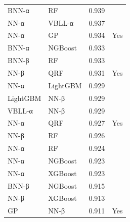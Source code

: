 \begin{tabular}{llrl}
BNN-α & RF & 0.939 &  \\
NN-α & VBLL-α & 0.937 &  \\
NN-α & GP & 0.934 & Yes \\
BNN-α & NGBoost & 0.933 &  \\
BNN-β & RF & 0.933 &  \\
NN-β & QRF & 0.931 & Yes \\
NN-α & LightGBM & 0.929 &  \\
LightGBM & NN-β & 0.929 &  \\
VBLL-α & NN-β & 0.929 &  \\
NN-α & QRF & 0.927 & Yes \\
NN-β & RF & 0.926 &  \\
NN-α & RF & 0.924 &  \\
NN-α & NGBoost & 0.923 &  \\
NN-α & XGBoost & 0.923 &  \\
BNN-β & NGBoost & 0.915 &  \\
NN-β & XGBoost & 0.913 &  \\
GP & NN-β & 0.911 & Yes \\
\bottomrule
\end{tabular}